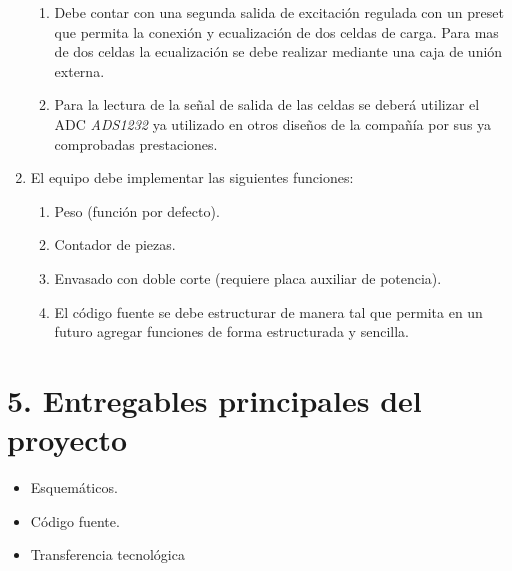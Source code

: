 \documentclass[11pt]{charter}
\begin{document}
\begin{enumerate}
\begin{enumerate}
	\item Debe contar con una segunda salida de excitación regulada con un preset que permita la conexión y ecualización de dos celdas de carga. Para mas de dos celdas la ecualización se debe realizar mediante una caja de unión externa.
	\item Para la lectura de la señal de salida de las celdas se deberá utilizar el ADC \textit{ADS1232} ya utilizado en otros diseños de la compañía por sus ya comprobadas prestaciones.
	\end{enumerate}	
\item El equipo debe implementar las siguientes funciones:
	\begin{enumerate}
	\item Peso (función por defecto).
	\item Contador de piezas.
	\item Envasado con doble corte (requiere placa auxiliar de potencia).
	\item El código fuente se debe estructurar de manera tal que permita en un futuro agregar funciones de forma estructurada y sencilla.
	\end{enumerate}				
\end{enumerate}

%

\section{5. Entregables principales del proyecto}
\label{sec:entregables}

\begin{itemize}
\item Esquemáticos.
\item Código fuente.
\item Transferencia tecnológica

\end{itemize}
\end{document}
